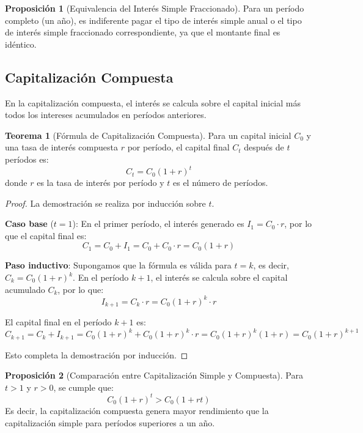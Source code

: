 \documentclass[12pt,a4paper]{article}
\theoremstyle{definition}
\newtheorem{teorema}{Teorema}[section]
\newtheorem{proposicion}{Proposición}[section]
\begin{document}
\begin{proposicion}[Equivalencia del Interés Simple Fraccionado]
Para un período completo (un año), es indiferente pagar el tipo de interés simple anual o el tipo de interés simple fraccionado correspondiente, ya que el montante final es idéntico.
\end{proposicion}

\subsection{Capitalización Compuesta}

En la capitalización compuesta, el interés se calcula sobre el capital inicial más todos los intereses acumulados en períodos anteriores.

\begin{teorema}[Fórmula de Capitalización Compuesta]
Para un capital inicial $C_0$ y una tasa de interés compuesta $r$ por período, el capital final $C_t$ después de $t$ períodos es:
\begin{equation}
C_t = C_0(1 + r)^t
\end{equation}
donde $r$ es la tasa de interés por período y $t$ es el número de períodos.
\end{teorema}

\begin{center}
    
\end{center}


\begin{proof}
La demostración se realiza por inducción sobre $t$.

\textbf{Caso base} ($t = 1$): En el primer período, el interés generado es $I_1 = C_0 \cdot r$, por lo que el capital final es:
$$C_1 = C_0 + I_1 = C_0 + C_0 \cdot r = C_0(1 + r)$$

\textbf{Paso inductivo}: Supongamos que la fórmula es válida para $t = k$, es decir, $C_k = C_0(1 + r)^k$. En el período $k+1$, el interés se calcula sobre el capital acumulado $C_k$, por lo que:
$$I_{k+1} = C_k \cdot r = C_0(1 + r)^k \cdot r$$

El capital final en el período $k+1$ es:
$$C_{k+1} = C_k + I_{k+1} = C_0(1 + r)^k + C_0(1 + r)^k \cdot r = C_0(1 + r)^k(1 + r) = C_0(1 + r)^{k+1}$$

Esto completa la demostración por inducción.
\end{proof}

\begin{proposicion}[Comparación entre Capitalización Simple y Compuesta]
Para $t > 1$ y $r > 0$, se cumple que:
\begin{equation}
C_0(1 + r)^t > C_0(1 + rt)
\end{equation}
Es decir, la capitalización compuesta genera mayor rendimiento que la capitalización simple para períodos superiores a un año.
\end{proposicion}
\end{document}
